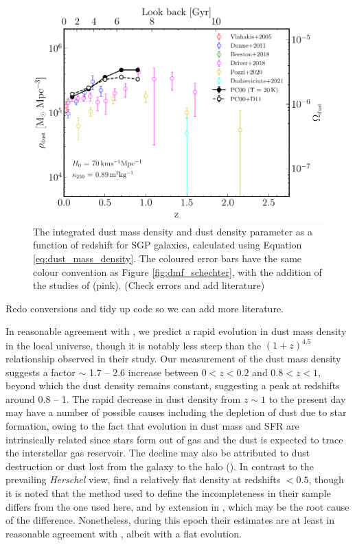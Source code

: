\begin{figure}
	\centering
	\includegraphics[width=0.75\columnwidth]{Figures/dmd.pdf}
	\caption{The integrated dust mass density and dust density parameter as a function of redshift for SGP galaxies, calculated using Equation \ref{eq:dust_mass_density}. The coloured error bars have the same colour convention as Figure \ref{fig:dmf_schechter}, with the addition of the studies of \citealt{Driver_2018} (pink). {\color{red} (Check errors and add literature)}}
	\label{fig:dmd}
\end{figure}

{\color{red}Redo conversions and tidy up code so we can add more literature.}

In reasonable agreement with \citealt{Dunne_2011}, we predict a rapid evolution in dust mass density in the local universe, though it is notably less steep than the $(1+z)^{4.5}$ relationship observed in their study. Our measurement of the dust mass density suggests a factor $\sim$ 1.7 -- 2.6 increase between $0 < z < 0.2$ and $0.8 < z < 1$, beyond which the dust density remains constant, suggesting a peak at redshifts around 0.8 -- 1. The rapid decrease in dust density from $z \sim 1$ to the present day may have a number of possible causes including the depletion of dust due to star formation, owing to the fact that evolution in dust mass and SFR are intrinsically related since stars form out of gas and the dust is expected to trace the interstellar gas reservoir. The decline may also be attributed to dust destruction or dust lost from the galaxy to the halo (\citealt{Dunne_2011}). In contrast to the prevailing \textit{Herschel} view, \citealt{Driver_2018} find a relatively flat density at redshifts $< 0.5$, though it is noted that the method used to define the incompleteness in their sample differs from the one used here, and by extension in \citealt{Dunne_2011}, which may be the root cause of the difference. Nonetheless, during this epoch their estimates are at least in reasonable agreement with \citealt{Dunne_2011}, albeit with a flat evolution.

